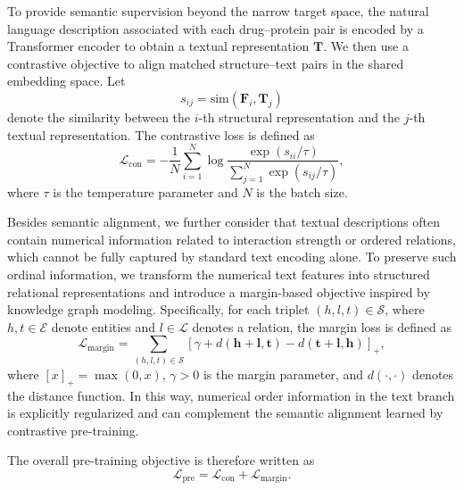\documentclass[preprint,12pt]{elsarticle}
\theoremstyle{plain}
\theoremstyle{definition}
\theoremstyle{remark}
\begin{document}
To provide semantic supervision beyond the narrow target space, the natural language description associated with each drug--protein pair is encoded by a Transformer encoder to obtain a textual representation $\mathbf{T}$. We then use a contrastive objective to align matched structure--text pairs in the shared embedding space. Let
\begin{equation}
s_{ij} = \mathrm{sim}(\mathbf{F}_i,\mathbf{T}_j)
\end{equation}
denote the similarity between the $i$-th structural representation and the $j$-th textual representation. The contrastive loss is defined as
\begin{equation}
\mathcal{L}_{\mathrm{con}} =
-\frac{1}{N}\sum_{i=1}^{N}
\log
\frac{\exp(s_{ii}/\tau)}
{\sum_{j=1}^{N}\exp(s_{ij}/\tau)},
\end{equation}
where $\tau$ is the temperature parameter and $N$ is the batch size.

Besides semantic alignment, we further consider that textual descriptions often contain numerical information related to interaction strength or ordered relations, which cannot be fully captured by standard text encoding alone. To preserve such ordinal information, we transform the numerical text features into structured relational representations and introduce a margin-based objective inspired by knowledge graph modeling. Specifically, for each triplet $(h,l,t)\in\mathcal{S}$, where $h,t\in\mathcal{E}$ denote entities and $l\in\mathcal{L}$ denotes a relation, the margin loss is defined as
\begin{equation}
\mathcal{L}_{\mathrm{margin}}
=
\sum_{(h,l,t)\in\mathcal{S}}
\left[
\gamma + d(\mathbf{h}+\mathbf{l},\mathbf{t}) - d(\mathbf{t}+\mathbf{l},\mathbf{h})
\right]_+,
\end{equation}
where $[x]_+=\max(0,x)$, $\gamma>0$ is the margin parameter, and $d(\cdot,\cdot)$ denotes the distance function. In this way, numerical order information in the text branch is explicitly regularized and can complement the semantic alignment learned by contrastive pre-training.

The overall pre-training objective is therefore written as
\begin{equation}
\mathcal{L}_{\mathrm{pre}}
=
\mathcal{L}_{\mathrm{con}} + \mathcal{L}_{\mathrm{margin}}.
\end{equation}
\end{document}
